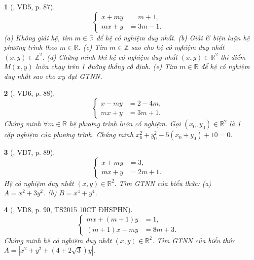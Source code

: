 \documentclass{article}
\newtheorem{baitoan}{}
\begin{document}
\begin{baitoan}[\cite{Kien_dai_so_9}, VD5, p. 87]
	\begin{equation*}
		\left\{\begin{split}
			x + my &= m + 1,\\
			mx + y &= 3m - 1.
		\end{split}\right.
	\end{equation*}
	(a) Không giải hệ, tìm $m\in\mathbb{R}$ để hệ có nghiệm duy nhất. (b) Giải \& biện luận hệ phương trình theo $m\in\mathbb{R}$. (c) Tìm $m\in\mathbb{Z}$ sao cho hệ có nghiệm duy nhất $(x,y)\in\mathbb{Z}^2$. (d) Chứng minh khi hệ có nghiệm duy nhất $(x,y)\in\mathbb{R}^2$ thì điểm $M(x,y)$ luôn chạy trên 1 đường thẳng cố định. (e) Tìm $m\in\mathbb{R}$ để hệ có nghiệm duy nhất sao cho $xy$ đạt {\rm GTNN}.
\end{baitoan}

\begin{baitoan}[\cite{Kien_dai_so_9}, VD6, p. 88]
	\begin{equation*}
		\left\{\begin{split}
			x - my &= 2 - 4m,\\
			mx + y &= 3m + 1.
		\end{split}\right.
	\end{equation*}
	Chứng minh $\forall m\in\mathbb{R}$ hệ phương trình luôn có nghiệm. Gọi $(x_0,y_0)\in\mathbb{R}^2$ là 1 cặp nghiệm của phương trình. Chứng minh $x_0^2 + y_0^2 - 5(x_0 + y_0) + 10 = 0$.
\end{baitoan}

\begin{baitoan}[\cite{Kien_dai_so_9}, VD7, p. 89]
	\begin{equation*}
		\left\{\begin{split}
			x + my &= 3,\\
			mx + y &= 2m + 1.
		\end{split}\right.
	\end{equation*}
	Hệ có nghiệm duy nhất $(x,y)\in\mathbb{R}^2$. Tìm {\rm GTNN} của biểu thức: (a) $A = x^2 + 3y^2$. (b) $B = x^4 + y^4$.
\end{baitoan}

\begin{baitoan}[\cite{Kien_dai_so_9}, VD8, p. 90, TS2015 10CT ĐHSPHN]
	\begin{equation*}
		\left\{\begin{split}
			mx + (m + 1)y &= 1,\\
			(m + 1)x - my &= 8m + 3.
		\end{split}\right.
	\end{equation*}
	Chứng minh hệ có nghiệm duy nhất $(x,y)\in\mathbb{R}^2$. Tìm {\rm GTNN} của biểu thức $A = |x^2 + y^2 + (4 + 2\sqrt{3})y|$.
\end{baitoan}
\end{document}
